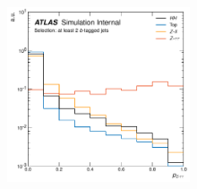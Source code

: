 \begin{figure}[!htb]
\begin{center}
        \includegraphics[width=0.48\textwidth]{figures/search_hh/nn_disc/pi_plot_NN_p_ztt}
        \caption{
        }
        \label{fig:nn_disc_p}
    \end{center}
\end{figure}

